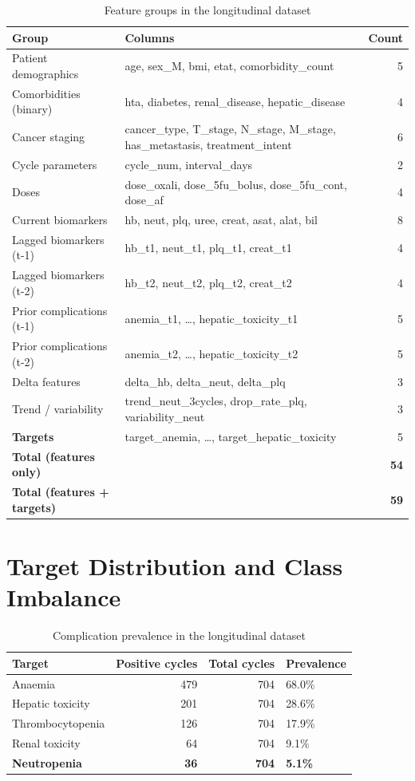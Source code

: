 \documentclass[12pt,a4paper]{report}
\begin{document}
\begin{table}[H]
\centering
\caption{Feature groups in the longitudinal dataset}
\label{tab:features}
\begin{tabular}{lp{5cm}r}
\toprule
\textbf{Group} & \textbf{Columns} & \textbf{Count} \\
\midrule
Patient demographics & age, sex\_M, bmi, etat, comorbidity\_count & 5 \\
Comorbidities (binary) & hta, diabetes, renal\_disease, hepatic\_disease & 4 \\
Cancer staging & cancer\_type, T\_stage, N\_stage, M\_stage, has\_metastasis, treatment\_intent & 6 \\
Cycle parameters & cycle\_num, interval\_days & 2 \\
Doses & dose\_oxali, dose\_5fu\_bolus, dose\_5fu\_cont, dose\_af & 4 \\
Current biomarkers & hb, neut, plq, uree, creat, asat, alat, bil & 8 \\
Lagged biomarkers (t-1) & hb\_t1, neut\_t1, plq\_t1, creat\_t1 & 4 \\
Lagged biomarkers (t-2) & hb\_t2, neut\_t2, plq\_t2, creat\_t2 & 4 \\
Prior complications (t-1) & anemia\_t1, \ldots, hepatic\_toxicity\_t1 & 5 \\
Prior complications (t-2) & anemia\_t2, \ldots, hepatic\_toxicity\_t2 & 5 \\
Delta features & delta\_hb, delta\_neut, delta\_plq & 3 \\
Trend / variability & trend\_neut\_3cycles, drop\_rate\_plq, variability\_neut & 3 \\
\textbf{Targets} & target\_anemia, \ldots, target\_hepatic\_toxicity & 5 \\
\midrule
\textbf{Total (features only)} & & \textbf{54} \\
\textbf{Total (features + targets)} & & \textbf{59} \\
\bottomrule
\end{tabular}
\end{table}

\section{Target Distribution and Class Imbalance}

\begin{table}[H]
\centering
\caption{Complication prevalence in the longitudinal dataset}
\label{tab:imbalance}
\begin{tabular}{lrrl}
\toprule
\textbf{Target} & \textbf{Positive cycles} & \textbf{Total cycles} & \textbf{Prevalence} \\
\midrule
Anaemia & 479 & 704 & 68.0\% \\
Hepatic toxicity & 201 & 704 & 28.6\% \\
Thrombocytopenia & 126 & 704 & 17.9\% \\
Renal toxicity & 64 & 704 & 9.1\% \\
\textbf{Neutropenia} & \textbf{36} & \textbf{704} & \textbf{5.1\%} \\
\bottomrule
\end{tabular}
\end{table}
\end{document}
